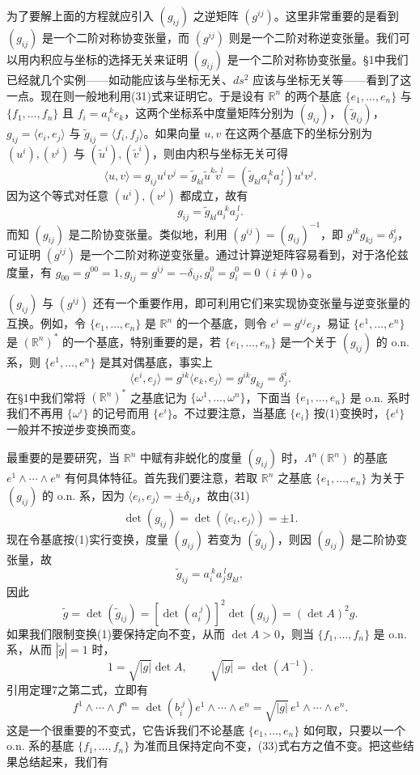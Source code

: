 为了要解上面的方程就应引入 $(g_{ij})$ 之逆矩阵 $(g^{ij})$。这里非常重要的是看到 $(g_{ij})$ 是一个二阶对称协变张量，而 $(g^{ij})$ 则是一个二阶对称逆变张量。我们可以用内积应与坐标的选择无关来证明 $(g_{ij})$ 是一个二阶对称协变张量。§1中我们已经就几个实例——如动能应该与坐标无关、$ds^2$ 应该与坐标无关等——看到了这一点。现在则一般地利用(31)式来证明它。于是设有 $\mathbb R^n$ 的两个基底 $\{e_1,\ldots,e_n\}$ 与 $\{f_1,\ldots,f_n\}$ 且 $f_i=a_i^{\ k}e_k$，这两个坐标系中度量矩阵分别为 $(g_{ij})$，$(\widetilde g_{ij})$，$g_{ij}=\langle e_i,e_j\rangle$ 与 $\widetilde g_{ij}=\langle f_i,f_j\rangle$。如果向量 $u,v$ 在这两个基底下的坐标分别为 $(u^i),(v^i)$ 与 $(\widetilde u^i),(\widetilde v^i)$，则由内积与坐标无关可得
\[
 \langle u,v\rangle=g_{ij}u^iv^j
 =\widetilde g_{kl}\widetilde u^k\widetilde v^l
 =(\widetilde g_{kl}a_i^{\ k}a_j^{\ l})u^iv^j.
\]
因为这个等式对任意 $(u^i),(v^j)$ 都成立，故有
\[
 g_{ij}=\widetilde g_{kl}a_i^{\ k}a_j^{\ l}.
\]
而知 $(g_{ij})$ 是二阶协变张量。类似地，利用 $(g^{ij})=(g_{ij})^{-1}$，即 $g^{ik}g_{kj}=\delta^i_j$，可证明 $(g^{ij})$ 是一个二阶对称逆变张量。通过计算逆矩阵容易看到，对于洛伦兹度量，有 $g_{00}=g^{00}=1,g_{ij}=g^{ij}=-\delta_{ij},g^0_i=g_i^0=0\ (i\ne0)$。

$(g_{ij})$ 与 $(g^{ij})$ 还有一个重要作用，即可利用它们来实现协变张量与逆变张量的互换。例如，令 $\{e_1,\ldots,e_n\}$ 是 $\mathbb R^n$ 的一个基底，则令 $e^i=g^{ij}e_j$，易证 $\{e^1,\ldots,e^n\}$ 是 $(\mathbb R^n)^*$ 的一个基底，特别重要的是，若 $\{e_1,\ldots,e_n\}$ 是一个关于 $(g_{ij})$ 的 o.n. 系，则 $\{e^1,\ldots,e^n\}$ 是其对偶基底，事实上
\[
 \langle e^i,e_j\rangle=g^{ik}\langle e_k,e_j\rangle=g^{ik}g_{kj}=\delta^i_j.
\]
在§1中我们常将 $(\mathbb R^n)^*$ 之基底记为 $\{\omega^1,\ldots,\omega^n\}$，下面当 $\{e_1,\ldots,e_n\}$ 是 o.n. 系时我们不再用 $\{\omega^i\}$ 的记号而用 $\{e^i\}$。不过要注意，当基底 $\{e_i\}$ 按(1)变换时，$\{e^i\}$ 一般并不按逆步变换而变。

最重要的是要研究，当 $\mathbb R^n$ 中赋有非蜕化的度量 $(g_{ij})$ 时，$\Lambda^n(\mathbb R^n)$ 的基底 $e^1\wedge\cdots\wedge e^n$ 有何具体特征。首先我们要注意，若取 $\mathbb R^n$ 之基底 $\{e_1,\ldots,e_n\}$ 为关于 $(g_{ij})$ 的 o.n. 系，因为 $\langle e_i,e_j\rangle=\pm\delta_{ij}$，故由(31)
\[
 \det(g_{ij})=\det(\langle e_i,e_j\rangle)=\pm1.
\]
现在令基底按(1)实行变换，度量 $(g_{ij})$ 若变为 $(\widetilde g_{ij})$，则因 $(g_{ij})$ 是二阶协变张量，故
\[
 \widetilde g_{ij}=a_i^{\ k}a_j^{\ l}g_{kl},
\]
因此
\[
 \widetilde g=\det(\widetilde g_{ij})=[\det(a_i^{\ j})]^2\det(g_{ij})=(\det A)^2g.
\]
如果我们限制变换(1)要保持定向不变，从而 $\det A>0$，则当 $\{f_1,\ldots,f_n\}$ 是 o.n. 系，从而 $|\widetilde g|=1$ 时，
\[
 1=\sqrt{|g|}\det A,\qquad \sqrt{|g|}=\det(A^{-1}).
\]
引用定理7之第二式，立即有
\begin{equation}
 f^1\wedge\cdots\wedge f^n
 =\det(b_i^{\ j})e^1\wedge\cdots\wedge e^n
 =\sqrt{|g|}\,e^1\wedge\cdots\wedge e^n.
 \tag{33}
\end{equation}
这是一个很重要的不变式，它告诉我们不论基底 $\{e_1,\ldots,e_n\}$ 如何取，只要以一个 o.n. 系的基底 $\{f_1,\ldots,f_n\}$ 为准而且保持定向不变，(33)式右方之值不变。把这些结果总结起来，我们有

